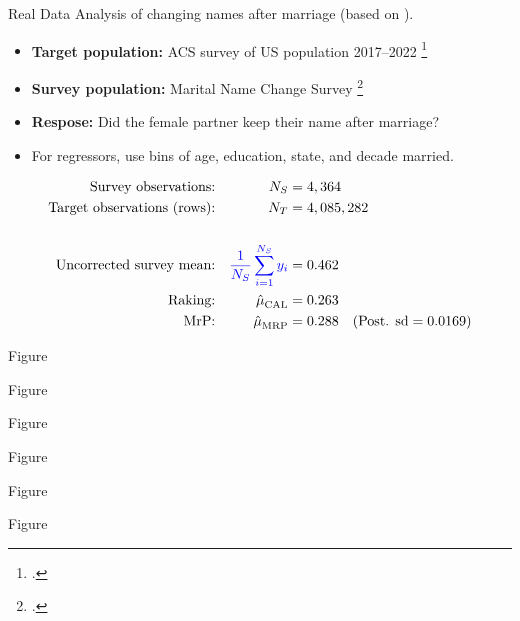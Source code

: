 
\begin{frame}{Real Data}
Analysis of changing names after marriage (based on \textcite{alexander:2019:namechange}).

\begin{itemize}
    \item \textbf{Target population:} ACS survey of US population 2017--2022 \footcite{ipumsusa}
    \item \textbf{Survey population:} Marital Name Change Survey \footcite{cohen:2019:namechange}
    \item \textbf{Respose:}  Did the female partner keep their name after marriage?
    \item For regressors, use bins of age, education, state, and decade married.
\end{itemize}

$$
\begin{aligned}
    \textrm{Survey observations:} &&  {N_S} ={}& 4,364  \\
    \textrm{Target observations (rows):} &&  {N_T} ={}& 4,085,282 \\
    \\
    \textrm{Uncorrected survey mean:} && \textcolor{blue}{\frac{1}{{N_S}} \sum_{i=1}^{N_S} y_i} ={}& 0.462 \\
    \textrm{Raking:} && \hat{\mu}^{}_{\mathrm{CAL}} ={}& 0.263 \\
    \textrm{MrP:} && \hat{\mu}^{}_{\mathrm{MRP}} ={}& 0.288
        \quad(\textrm{Post. sd} = 0.0169)\\
\end{aligned}
$$
%
\end{frame}


\begin{frame}{Figure}
\AlexanderImbalancePrimary{}
\end{frame}


\begin{frame}{Figure}
\AlexanderImbalanceInteraction{}
\end{frame}


\begin{frame}{Figure}
    \AlexanderPredictionFig{}
\end{frame}



\begin{frame}{Figure}
    \AlexanderPredictionFigTwo{}
\end{frame}




\begin{frame}{Figure}
    \AlexanderPredictionFigThree{}
\end{frame}



\begin{frame}{Figure}
    \AlexanderPredictionFigFour{}
\end{frame}


